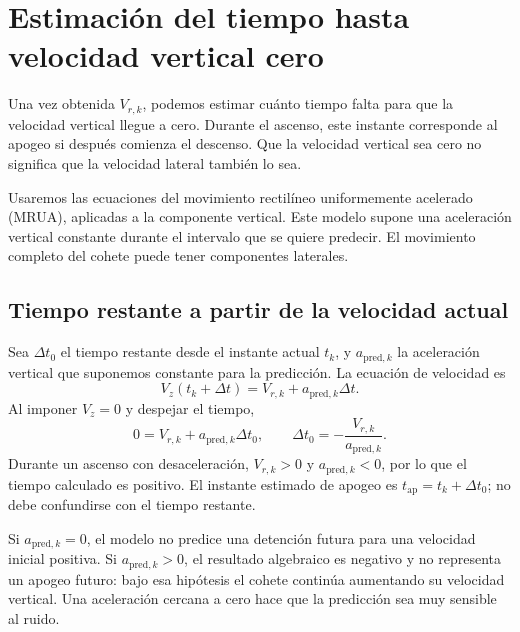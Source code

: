 \newpage
\section{Estimación del tiempo hasta velocidad vertical cero}
Una vez obtenida $V_{r,k}$, podemos estimar cuánto tiempo falta para que la velocidad vertical llegue a cero. Durante el ascenso, este instante corresponde al apogeo si después comienza el descenso. Que la velocidad vertical sea cero no significa que la velocidad lateral también lo sea.

Usaremos las ecuaciones del movimiento rectilíneo uniformemente acelerado (MRUA), aplicadas a la componente vertical. Este modelo supone una aceleración vertical constante durante el intervalo que se quiere predecir. El movimiento completo del cohete puede tener componentes laterales.

\subsection{Tiempo restante a partir de la velocidad actual}
Sea $\Delta t_0$ el tiempo restante desde el instante actual $t_k$, y $a_{\mathrm{pred},k}$ la aceleración vertical que suponemos constante para la predicción. La ecuación de velocidad es
\begin{equation}
 V_z(t_k+\Delta t)=V_{r,k}+a_{\mathrm{pred},k}\Delta t.
\end{equation}
Al imponer $V_z=0$ y despejar el tiempo,
\begin{equation}
 0=V_{r,k}+a_{\mathrm{pred},k}\Delta t_0,
 \qquad
 \boxed{\Delta t_0=-\frac{V_{r,k}}{a_{\mathrm{pred},k}}}.
\end{equation}
Durante un ascenso con desaceleración, $V_{r,k}>0$ y $a_{\mathrm{pred},k}<0$, por lo que el tiempo calculado es positivo. El instante estimado de apogeo es $t_{\mathrm{ap}}=t_k+\Delta t_0$; no debe confundirse con el tiempo restante.

Si $a_{\mathrm{pred},k}=0$, el modelo no predice una detención futura para una velocidad inicial positiva. Si $a_{\mathrm{pred},k}>0$, el resultado algebraico es negativo y no representa un apogeo futuro: bajo esa hipótesis el cohete continúa aumentando su velocidad vertical. Una aceleración cercana a cero hace que la predicción sea muy sensible al ruido.

